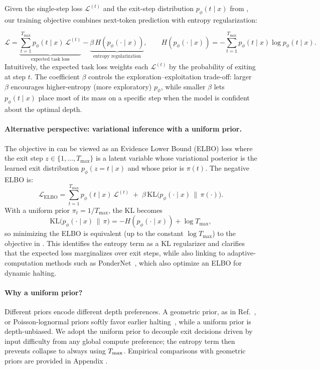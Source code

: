 \documentclass[]{bytedance_seed}
\newcommand{\1}{\mathbf{1}}
\begin{document}
Given the single-step loss $\mathcal{L}^{(t)}$ and the exit-step distribution $p_\phi(t \mid x)$ from , our training objective combines next-token prediction with entropy regularization:

\begin{equation}\label{eqdef:entropy-reg-obj}
    \mathcal{L}
    = \underbrace{\sum_{t=1}^{T_{\max}} p_\phi(t \mid x)\,\mathcal{L}^{(t)}}_{\text{expected task loss}}
    - \underbrace{\beta \,H\!\left(p_\phi(\cdot \mid x)\right)}_{\text{entropy regularization}},
    \qquad
    H\!\left(p_\phi(\cdot \mid x)\right)
    = -\sum_{t=1}^{T_{\max}} p_\phi(t \mid x) \log p_\phi(t \mid x).
\end{equation}
Intuitively, the expected task loss weights each $\mathcal{L}^{(t)}$ by the probability of exiting at step $t$. The coefficient $\beta$ controls the exploration–exploitation trade-off: larger $\beta$ encourages higher-entropy (more exploratory) $p_\phi$, while smaller $\beta$ lets $p_\phi(t \mid x)$ place most of its mass on a specific step when the model is confident about the optimal depth.

\paragraph{Alternative perspective: variational inference with a uniform prior.}
The objective in  can be viewed as an Evidence Lower Bound (ELBO) loss where the exit step $z \in \{1,\dots,T_{\max}\}$ is a latent variable whose variational posterior is the learned exit distribution $p_\phi(z{=}t\mid x)$ and whose prior is $\pi(t)$. The negative ELBO is:
\[
\mathcal{L}_{\text{ELBO}}
= \sum_{t=1}^{T_{\max}} p_\phi(t \mid x)\, \mathcal{L}^{(t)}
\;+\; \beta \, \mathrm{KL}\!\big(p_\phi(\cdot \mid x)\,\|\,\pi(\cdot)\big).
\]
With a uniform prior $\pi_t = 1/T_{\max}$, the KL becomes
\[
\mathrm{KL}\!\big(p_\phi(\cdot \mid x)\,\|\,\pi\big)
= -H\!\left(p_\phi(\cdot \mid x)\right) + \log T_{\max},
\]
so minimizing the ELBO is equivalent (up to the constant $\log T_{\max}$) to the objective in . This identifies the entropy term as a KL regularizer and clarifies that the expected loss marginalizes over exit steps, while also linking to adaptive-computation methods such as PonderNet~\cite{banino2021pondernet}, which also optimize an ELBO for dynamic halting.

\paragraph{Why a uniform prior?}
Different priors encode different depth preferences. A geometric prior, as in Ref.~\cite{banino2021pondernet}, or Poisson-lognormal priors softly favor earlier halting~\cite{geiping2025scaling}, while a uniform prior is depth-unbiased. We adopt the uniform prior to decouple exit decisions driven by input difficulty from any global compute preference; the entropy term then prevents collapse to always using $T_{\rm max}$. Empirical comparisons with geometric priors are provided in Appendix .
\end{document}
